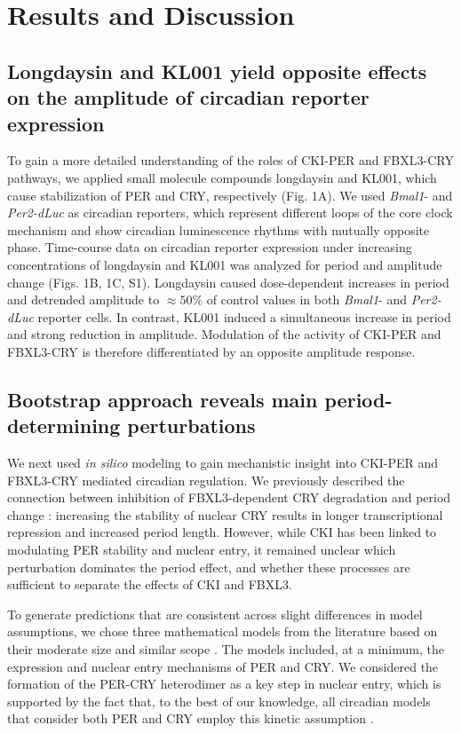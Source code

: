 \section{Results and Discussion}
\subsection{Longdaysin and KL001 yield opposite effects on the amplitude of
circadian reporter expression}
To gain a more detailed understanding of the roles of CKI-PER and FBXL3-CRY
pathways, we applied small molecule
compounds longdaysin and KL001, which cause stabilization of PER and CRY,
respectively \cite{Hirota2010, Hirota2012} (Fig. 1A). We used {\it Bmal1}- and
{\it Per2-dLuc} as circadian reporters, which represent different loops of the
core clock mechanism and show circadian luminescence rhythms with mutually
opposite phase.  Time-course data on circadian reporter expression under
increasing concentrations of longdaysin and KL001 \cite{Hirota2012} was
analyzed for period and amplitude change (Figs. 1B, 1C, S1). Longdaysin caused
dose-dependent increases in period and detrended amplitude to $\approx 50\%$ of
control values in both {\it Bmal1}- and {\it Per2-dLuc} reporter cells. In
contrast, KL001 induced a simultaneous increase in period and strong reduction
in amplitude. Modulation of the activity of CKI-PER and FBXL3-CRY is therefore
differentiated by an opposite amplitude response.

\subsection{Bootstrap approach reveals main period-determining perturbations}

We next used {\it in silico} modeling to gain mechanistic insight into CKI-PER
and FBXL3-CRY mediated circadian regulation. We previously described the
connection between inhibition of FBXL3-dependent CRY degradation and period
change \cite{Hirota2012}: increasing the stability of nuclear CRY results in
longer transcriptional repression and increased period length. However, while
CKI has been linked to modulating PER stability and nuclear entry, it remained
unclear which perturbation dominates the period effect, and whether these
processes are sufficient to separate the effects of CKI and FBXL3.

To generate predictions that are consistent across slight differences in model
assumptions, we chose three mathematical models from the literature based on
their moderate size and similar scope \cite{Hirota2012, Leloup2003,
Relogio2011}. The models included, at a minimum, the expression and nuclear
entry mechanisms of PER and CRY. We considered the formation of the PER-CRY
heterodimer as a key step in nuclear entry, which is supported by the fact that,
to the best of our knowledge, all circadian models that consider both PER and
CRY employ this kinetic assumption \cite{Hirota2012, Relogio2011, Leloup2003,
Forger2003, Mirsky2009}.


